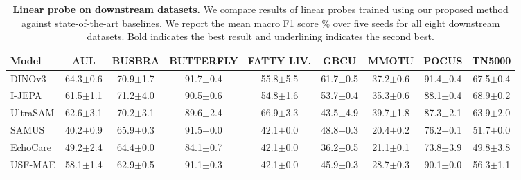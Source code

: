 \documentclass{article}
\theoremstyle{plain}
\theoremstyle{definition}
\theoremstyle{remark}
\begin{document}
\begin{table}[t]
  \caption{\textbf{Linear probe on downstream datasets.} We compare results of linear probes trained using our proposed method against state-of-the-art baselines. We report the mean macro F1 score \% over five seeds for all eight downstream datasets. Bold indicates the best result and underlining indicates the second best.}
  \label{downstream-table}
  \begin{center}
    \begin{small}
      \begin{sc} 
        \begin{tabular}{lcccccccc}
          \toprule
          Model & AUL & BUSBRA & BUTTERFLY & FATTY LIV. & GBCU & MMOTU & POCUS & TN5000 \\
          \midrule
          DINOv3       & 64.3$\pm$0.6 & 70.9$\pm$1.7 & 91.7$\pm$0.4 & 55.8$\pm$5.5 & 61.7$\pm$0.5 & 37.2$\pm$0.6 & 91.4$\pm$0.4 & 67.5$\pm$0.4 \\
          I-JEPA       & 61.5$\pm$1.1 & 71.2$\pm$4.0 & 90.5$\pm$0.6 & 54.8$\pm$1.6 & 53.7$\pm$0.4 & 35.3$\pm$0.6 & 88.1$\pm$0.4 & 68.9$\pm$0.2 \\
          \midrule
          UltraSAM     & 62.6$\pm$3.1 & 70.2$\pm$3.1 & 89.6$\pm$2.4 & 66.9$\pm$3.3 & 43.5$\pm$4.9 & 39.7$\pm$1.8 & 87.3$\pm$2.1 & 63.9$\pm$2.0 \\
          SAMUS        & 40.2$\pm$0.9 & 65.9$\pm$0.3 & 91.5$\pm$0.0 & 42.1$\pm$0.0 & 48.8$\pm$0.3 & 20.4$\pm$0.2 & 76.2$\pm$0.1 & 51.7$\pm$0.0 \\
          EchoCare     & 49.2$\pm$2.4 & 64.4$\pm$0.0 & 84.1$\pm$0.7 & 42.1$\pm$0.0 & 36.2$\pm$0.5 & 21.1$\pm$0.1 & 73.8$\pm$3.9 & 49.8$\pm$3.8 \\
          USF-MAE      & 58.1$\pm$1.4 & 62.9$\pm$0.5 & 91.1$\pm$0.3 & 42.1$\pm$0.0 & 45.9$\pm$0.3 & 28.7$\pm$0.3 & 90.1$\pm$0.0 & 56.3$\pm$1.1 \\
          

\end{tabular}
\end{sc}
\end{small}
\end{center}
\end{table}
\end{document}
